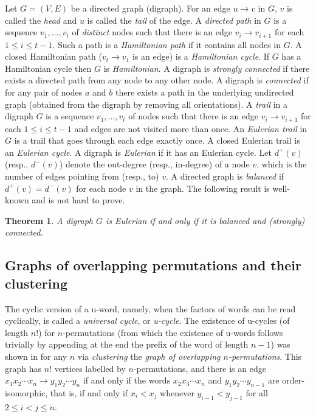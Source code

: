 \documentclass[12pt]{article}
\newtheorem{thm}{Theorem}[section]
\begin{document}
Let $G=(V,E)$ be a directed graph (digraph). For an edge $u\rightarrow v$ in $G$, $v$ is called the {\em head} and $u$ is called the {\em tail} of the edge. A {\em directed path} in $G$ is a sequence $v_1,\ldots,v_t$ of {\em distinct} nodes such that there is an edge $v_i\rightarrow v_{i+1}$ for each $1\leq i\leq t-1$. Such a path is  a {\em Hamiltonian path} if it contains all nodes in $G$. A closed Hamiltonian path ($v_t\rightarrow v_1$ is an edge) is a {\em Hamiltonian cycle}. If $G$ has a Hamiltonian cycle then $G$ is {\em Hamiltonian}. A digraph is {\em strongly connected} if there exists a directed path from any node to any other node.  A digraph is {\em connected} if for any pair of nodes $a$ and $b$ there exists a path in the underlying undirected graph (obtained from the digraph by removing all orientations). A {\em trail} in a digraph $G$ is a sequence $v_1,\ldots,v_t$ of nodes such that there is an edge $v_i\rightarrow v_{i+1}$ for each $1\leq i\leq t-1$ and edges are not visited more than once. An {\em Eulerian trail} in $G$ is a trail that goes through each edge exactly once. A closed Eulerian trail is an {\em Eulerian cycle}.  A digraph is {\em Eulerian}  if it has an Eulerian cycle. Let $d^+(v)$ (resp., $d^-(v)$) denote the out-degree (resp., in-degree)  of a node $v$, which is the number of edges pointing from (resp., to) $v$. A directed graph is {\em balanced} if $d^+(v)=d^-(v)$ for each node $v$ in the graph. The following result is well-known and is not hard to prove.

\begin{thm}\label{Eulerian-trail} A digraph $G$ is Eulerian if and only if it is balanced and (strongly) connected.\end{thm}


\subsection{Graphs of overlapping permutations and their clustering}

The cyclic version of a u-word, namely, when the factors of words can be read cyclically, is called a {\em universal cycle}, or {\em u-cycle}. The existence of u-cycles (of length $n!$) for $n$-permutations (from which the existence of u-words follows trivially by appending at the end the prefix of the word of length $n-1$)  was shown in  \cite{CDG1992} for any $n$ via {\em clustering} the {\em graph of overlapping $n$-permutations}. This graph has $n!$ vertices labelled by $n$-permutations, and there is an edge $x_1x_2\cdots x_n\rightarrow y_1y_2\cdots y_n$ if and only if the words $x_2x_3\cdots x_n$ and $y_1y_2\cdots y_{n-1}$ are order-isomorphic, that is, if and only if $x_i<x_j$ whenever $y_{i-1}<y_{j-1}$ for all $2\leq i<j\leq n$.
\end{document}
